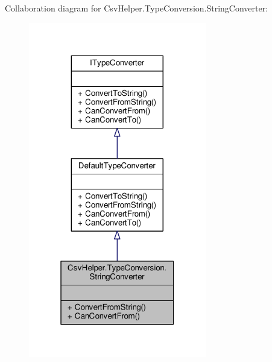 Collaboration diagram for Csv\-Helper.\-Type\-Conversion.\-String\-Converter\-:
\nopagebreak
\begin{figure}[H]
\begin{center}
\leavevmode
\includegraphics[width=220pt]{a00538}
\end{center}
\end{figure}
